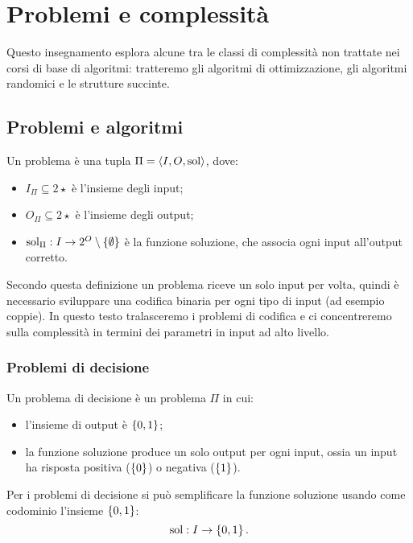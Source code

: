 \chapter{Problemi e complessità}
Questo insegnamento esplora alcune tra le classi di complessità non trattate nei corsi di base di algoritmi: tratteremo gli algoritmi di ottimizzazione, gli algoritmi randomici e le strutture succinte.



\section{Problemi e algoritmi}
\begin{defin}[problema]
	Un problema è una tupla $\Pi=\langle I,O,\mathrm{sol} \rangle$, dove:
	\begin{itemize}
		\item $I_\Pi\subseteq 2\star$ è l'insieme degli input;
		\item $O_\Pi\subseteq 2\star$ è l'insieme degli output;
		\item $\mathrm{sol}_\Pi:I\to 2^O\setminus\left\{ \emptyset \right\}$ è la funzione soluzione, che associa ogni input all'output corretto.
	\end{itemize}
\end{defin}

Secondo questa definizione un problema riceve un solo input per volta, quindi è necessario sviluppare una codifica binaria per ogni tipo di input (ad esempio coppie). In questo testo tralasceremo i problemi di codifica e ci concentreremo sulla complessità in termini dei parametri in input ad alto livello.


\subsection{Problemi di decisione}
\begin{defin}
	Un problema di decisione è un problema $\Pi$ in cui:
	\begin{itemize}
		\item l'insieme di output è $\left\{ 0,1 \right\}$;
		\item la funzione soluzione produce un solo output per ogni input, ossia un input ha risposta positiva ($\left\{ 0 \right\}$) o negativa ($\left\{ 1 \right\}$).
	\end{itemize}
\end{defin}
Per i problemi di decisione si può semplificare la funzione soluzione usando come codominio l'insieme $\left\{ 0,1 \right\}$:
\begin{equation*}
	\mathrm{sol}:I\to\left\{ 0,1 \right\}\text.
\end{equation*}

